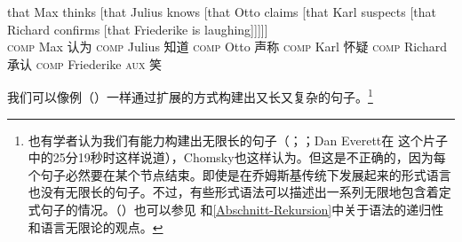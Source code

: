 \ea
\label{ex-that-max-thinks-that-recursion}
\gll that          Max thinks [that                 Julius knows [that Otto claims [that Karl suspects [that Richard confirms [that Friederike is laughing]]]]]\\
     \textsc{comp} Max 认为    \spacebr\textsc{comp} Julius 知道  \spacebr\textsc{comp} Otto 声称 \spacebr\textsc{comp} Karl 怀疑 \spacebr\textsc{comp} Richard 承认 \spacebr\textsc{comp} Friederike \textsc{aux} 笑\\
\z

\noindent
我们可以像例（）一样通过扩展的方式构建出又长又复杂的句子。\footnote{%
也有学者认为我们有能力构建出无限长的句子（\citealp*[]{NKN2001a}；\citealp[]{KS2008a-u}；Dan Everett在 这个片子中的25分19秒时这样说道），Chomsky也这样认为\citep[]{Leiss2003a}。但这是不正确的，因为每个句子必然要在某个节点结束。即使是在乔姆斯基传统下发展起来的形式语言也没有无限长的句子。不过，有些形式语法可以描述出一系列无限地包含着定式句子的情况。（\citealp[]{Chomsky57a}）也可以参见 和\ref{Abschnitt-Rekursion}中关于语法的递归性和语言无限论的观点。
}

